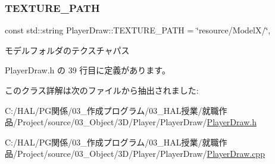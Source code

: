 \subsubsection{\texorpdfstring{T\+E\+X\+T\+U\+R\+E\+\_\+\+P\+A\+TH}{TEXTURE\_PATH}}
{\footnotesize\ttfamily const std\+::string Player\+Draw\+::\+T\+E\+X\+T\+U\+R\+E\+\_\+\+P\+A\+TH = \char`\"{}resource/ModelX/\char`\"{}\hspace{0.3cm}{\ttfamily [static]}, {\ttfamily [private]}}



モデルフォルダのテクスチャパス 



 Player\+Draw.\+h の 39 行目に定義があります。



このクラス詳解は次のファイルから抽出されました\+:\begin{DoxyCompactItemize}
\item 
C\+:/\+H\+A\+L/\+P\+G関係/03\+\_\+作成プログラム/03\+\_\+\+H\+A\+L授業/就職作品/\+Project/source/03\+\_\+\+Object/3\+D/\+Player/\+Player\+Draw/\mbox{\hyperlink{_player_draw_8h}{Player\+Draw.\+h}}\item 
C\+:/\+H\+A\+L/\+P\+G関係/03\+\_\+作成プログラム/03\+\_\+\+H\+A\+L授業/就職作品/\+Project/source/03\+\_\+\+Object/3\+D/\+Player/\+Player\+Draw/\mbox{\hyperlink{_player_draw_8cpp}{Player\+Draw.\+cpp}}\end{DoxyCompactItemize}
